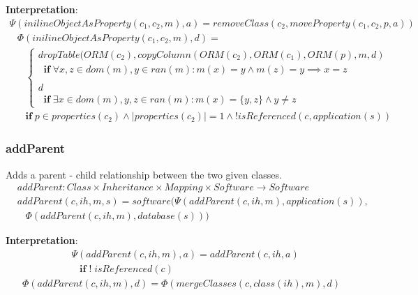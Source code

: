 \documentclass[10pt]{article}
\begin{document}
\noindent \textbf{Interpretation}:
\begin{align}
\Psi(inilineObjectAsProperty(c_1, c_2, m), a) =  removeClass(c_2, moveProperty(c_1, c_2, p, a))  
\end{align}
\begin{align}
& \Phi(inilineObjectAsProperty(c_1, c_2, m), d) = \nonumber \\ 
& \;\;\; \begin{cases}
 dropTable(ORM(c_2), copyColumn(ORM(c_2), ORM(c_1), ORM(p), m, d) \\
\;\; \mathbf{if} \;  \forall x, z \in dom(m), y \in ran(m) : m(x) = y \land  
 m(z) = y \implies x = z 
 \\\\
 d \\
 \;\; \mathbf{if} \; \exists x \in dom(m), y, z \in ran(m) : m(x) = \{y, z\} \land y \neq z
 \end{cases} \nonumber \\
& \;\;\; \mathbf{if} \; p \in properties(c_2) \land |properties(c_2)| = 1 \land ! isReferenced(c,application(s)) 
\end{align}


\subsubsection{addParent}
Adds a parent - child relationship between the two given classes.
\begin{align}
& addParent: Class \times Inheritance \times Mapping \times Software \rightarrow Software \nonumber \\
& addParent(c, ih, m, s) = software(\Psi(addParent(c, ih, m), application(s)), \nonumber \\
& \;\;\;  \Phi(addParent(c, ih, m), database(s)))
\end{align}

\noindent \textbf{Interpretation}:
\begin{align}
& \Psi(addParent(c, ih, m), a) = addParent(c, ih, a) \nonumber \\
& \;\;\; \mathbf{if} \; !\; isReferenced(c)
\end{align}
\begin{align}
\Phi(addParent(c, ih, m), d) = \Phi(mergeClasses(c, class(ih), m), d)
\end{align}

\end{document}

